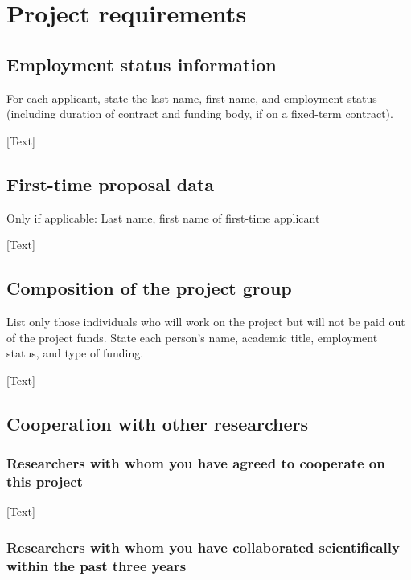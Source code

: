 \documentclass[a4paper,12pt]{article}
\begin{document}





\section{Project requirements}

\subsection{Employment status information}
 For each applicant, state the last name, first name, and employment status (including duration of contract and funding body, if on a fixed-term contract).

[Text]

\subsection{First-time proposal data}
Only if applicable: Last name, first name of first-time applicant

[Text]
\subsection{Composition of the project group}
List only those individuals who will work on the project but will not be paid out of the project funds. State each person’s name, academic title, employment status, and type of funding.

[Text]

\subsection{Cooperation with other researchers}

\subsubsection{Researchers with whom you have agreed to cooperate on this project}

[Text]

\subsubsection{Researchers with whom you have collaborated scientifically within the past three years}
\end{document}
